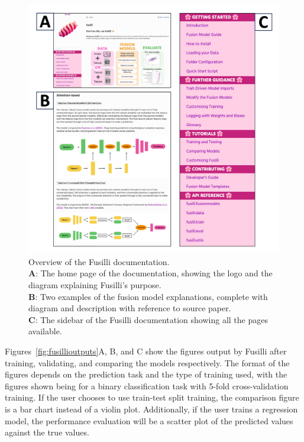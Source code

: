 \begin{figure}
    \centering
    \includegraphics[width=1\linewidth]{figures/fusilli_documentation}
    \caption{Overview of the Fusilli documentation. \\
    \textbf{A}: The home page of the documentation, showing the logo and the diagram explaining Fusilli's purpose.\\
    \textbf{B}: Two examples of the fusion model explanations, complete with diagram and description with reference to source paper. \\
    \textbf{C}: The sidebar of the Fusilli documentation showing all the pages available.
    }
    \label{fig:fusillidocs}
\end{figure}

Figures~\ref{fig:fusillioutputs}A, B, and C show the figures output by Fusilli after training, validating, and comparing the models respectively.
The format of the figures depends on the prediction task and the type of training used, with the figures shown being for a binary classification task with 5-fold cross-validation training.
If the user chooses to use train-test split training, the comparison figure is a bar chart instead of a violin plot.
Additionally, if the user trains a regression model, the performance evaluation will be a scatter plot of the predicted values against the true values.


